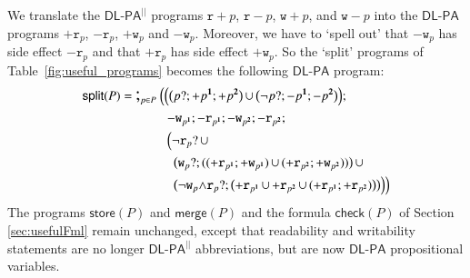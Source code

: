 \documentclass{llncs}
\newcommand{\progStore}{\mathsf{store}}
\newcommand{\progOkChange}{\mathsf{check}}
\newcommand{\progsplit}{\mathsf{split}}
\newcommand{\progmerge}{\mathsf{merge}}
\newcommand{\cp}[2]{{#2}^\mathbf{#1}}
\newcommand{\pll}{ {||} }							%
\newcommand{\readable}[1]{\mathtt{r}_{#1}}
\newcommand{\writable}[1]{\mathtt{w}_{#1}}
\newcommand{\testpdl}{?}				%
\newcommand{\Dlpa}{\ensuremath{\mathsf{DL\text{-}PA}}\xspace}
\newcommand{\DlpaPll}{\ensuremath{\mathsf{DL\text{-}PA}^\pll}\xspace}
\newcommand{\assgntop}[1]{{\mathtt {+} #1}}
\newcommand{\assgnbot}[1]{{\mathtt {-} #1}}
\newcommand{\assgntopR}[1]{{\mathtt r {+} #1}}
\newcommand{\assgnbotR}[1]{{\mathtt r {-} #1}}
\newcommand{\assgntopW}[1]{{\mathtt w {+} #1}}
\newcommand{\assgnbotW}[1]{{\mathtt w {-} #1}}
\newcommand{\assgntopV}[1]{{\mathtt {+} #1}}
\newcommand{\assgnbotV}[1]{{\mathtt {-} #1}}
\newcommand{\leqv}{ \leftrightarrow }
\newcommand{\limp}{ \rightarrow }
\newcommand{\ndet}{\,{\cup}\,}
\newcommand{\seqseq}[1]{ \text{\Large ;}_{#1} ~ }
\begin{document}
We translate the \DlpaPll programs
$\assgntopR{p}$, 
$\assgnbotR{p}$, 
$\assgntopW{p}$, and 
$\assgnbotW{p}$ 
into the \Dlpa programs 
$\assgntop{ \readable{p}}$,
$\assgnbot{ \readable{p}}$,
$\assgntop{ \writable{p}}$ and
$\assgnbot{ \writable{p}}$.
Moreover, we have to `spell out' that 
$\assgnbot{ \writable p }$ has side effect $\assgnbot{ \readable p }$ and that  
$\assgntop{ \readable p }$ has side effect $\assgntop{ \writable p }$. 
So the `split' programs of Table~\ref{fig:useful_programs} becomes the following \Dlpa program:
\begin{align*}
\progsplit(P) =&\ \seqseq{p \in P} \Big( 
\Big(
  \big( p \testpdl ; \assgntopV{ \cp{1}{p} } ; \assgntopV{ \cp{2}{p} } \big) \ndet 
  \big( \lnot p \testpdl ; \assgnbotV{ \cp{1}{p} } ; \assgnbotV{ \cp{2}{p} } \big) 
\Big) ;
\\& ~~~~~~~~~~~
\assgnbot{ \writable{\cp 1 {p}}} ; \assgnbot{ \readable{\cp 1 {p}}} ; \assgnbot{ \writable{\cp 2 {p}}} ; \assgnbot{ \readable{\cp 2 {p}}} ;
\\& ~~~~~~~~~~~
\Big(
  \lnot \readable p  \testpdl \ndet 
  \\& ~~~~~~~~~~~~~
  \big(\writable{p} \testpdl ; ( (\assgntop{ \readable{\cp 1 {p}}} ; \assgntop{ \writable{\cp 1 {p}}}) \ndet (\assgntop{ \readable{\cp 2 {p}}} ; \assgntop{ \writable{\cp 2 {p}}}) ) \big) 			 \ndet
  \\& ~~~~~~~~~~~~~
  \big(\lnot \writable{p} {\land} \readable p  \testpdl ; \big( \assgntop{ \readable{\cp 1 {p}}} \ndet \assgntop{ \readable{\cp 2 {p}}} \ndet 
(\assgntop{ \readable{\cp 1 {p}}}  ; \assgntop{ \readable{\cp 2 {p}}}) \big) \big) 
\Big)
\Big)
\end{align*}
The programs $\progStore(P)$ and $\progmerge(P)$ and the formula $\progOkChange(P)$
of Section \ref{sec:usefulFml} remain unchanged, except that 
readability and writability statements are no longer \DlpaPll abbreviations, but are now \Dlpa propositional variables. 
\end{document}
